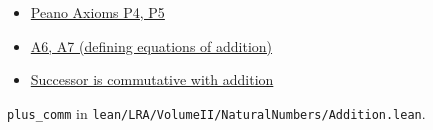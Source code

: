 \begin{remark*}[Dependencies]
\begin{itemize}
  \item \hyperref[ax:landau-peano]{Peano Axioms P4, P5}
  \item \hyperref[thm:landau-addition-exists-unique]{A6, A7 (defining equations of addition)}
  \item \hyperref[lem:landau-succ-comm]{Successor is commutative with addition}
\end{itemize}

\end{remark*}

\begin{remark*}
\texttt{plus\_comm} in
\texttt{lean/LRA/VolumeII/NaturalNumbers/Addition.lean}.
\end{remark*}